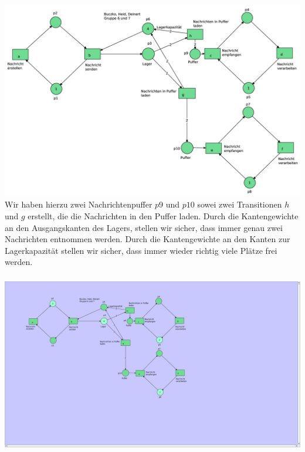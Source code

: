 \documentclass[a4paper,12pt]{scrartcl}
\begin{document}
\subsubsection{}
\includegraphics[scale=0.4]{6_4_4.png}
\\
Wir haben hierzu zwei Nachrichtenpuffer $p9$ und $p10$ sowei zwei 
Transitionen $h$ und $g$ erstellt, die die Nachrichten in den Puffer 
laden. Durch die Kantengewichte an den Ausgangskanten des Lagers, 
stellen wir sicher, dass immer genau zwei Nachrichten entnommen 
werden. Durch die Kantengewichte an den Kanten zur Lagerkapazität 
stellen wir sicher, dass immer wieder richtig viele Plätze frei 
werden. 

\subsubsection{}
\includegraphics[scale=0.4]{6_4_5.png}
\subsection{}
\end{document}

